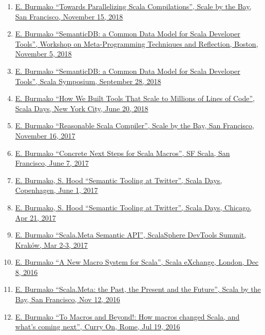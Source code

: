 \documentclass[margin, 10pt]{Stylesheet}
\begin{document}
\begin{resume}
\begin{enumerate} \itemsep -2pt
\item \href{https://github.com/twitter/rsc/raw/master/docs/2018-11-15-ScaleByTheBay.pdf}{E. Burmako ``Towards Parallelizing Scala Compilations'', Scale by the Bay, San Francisco, November 15, 2018}
\item \href{https://2018.splashcon.org/track/meta-2018#About}{E. Burmako ``SemanticDB: a Common Data Model for Scala Developer Tools'', Workshop on Meta-Programming Techniques and Reflection, Boston, November 5, 2018}
\item \href{https://conf.researchr.org/track/scala-2018/scala-2018-papers#About}{E. Burmako ``SemanticDB: a Common Data Model for Scala Developer Tools'', Scala Symposium, September 28, 2018}
\item \href{http://scalameta.org/talks/2018-06-20-HowWeBuiltToolsThatScaleToMillionsOfLoc.pdf}{E. Burmako ``How We Built Tools That Scale to Millions of Lines of Code'', Scala Days, New York City, June 20, 2018}
\item \href{https://github.com/twitter/rsc/raw/master/docs/2017-11-16-ScaleByTheBay.pdf}{E. Burmako ``Reasonable Scala Compiler'', Scale by the Bay, San Francisco, November 16, 2017}
\item \href{http://scalamacros.org/paperstalks/2017-06-07-ConcreteNextSteps.pdf}{E. Burmako ``Concrete Next Steps for Scala Macros'', SF Scala, San Francisco, June 7, 2017}
\item \href{http://scalameta.org/talks/2017-06-01-SemanticToolingAtTwitter.pdf}{E. Burmako, S. Hood ``Semantic Tooling at Twitter'', Scala Days, Copenhagen, June 1, 2017}
\item \href{http://scalameta.org/talks/2017-06-01-SemanticToolingAtTwitter.pdf}{E. Burmako, S. Hood ``Semantic Tooling at Twitter'', Scala Days, Chicago, Apr 21, 2017}
\item \href{http://scalamacros.org/paperstalks/2017-03-02-ScalaSphere.pdf}{E. Burmako ``Scala.Meta Semantic API'', ScalaSphere DevTools Summit, Krak\'{o}w, Mar 2-3, 2017}
\item \href{http://scalamacros.org/paperstalks/2016-12-08-Scalax.pdf}{E. Burmako ``A New Macro System for Scala'', Scala eXchange, London, Dec 8, 2016}
\item \href{http://scalamacros.org/paperstalks/2016-11-12-ScalaByTheBay.pdf}{E. Burmako ``Scala.Meta: the Past, the Present and the Future'', Scala by the Bay, San Francisco, Nov 12, 2016}
\item \href{http://scalamacros.org/paperstalks/2016-07-19-ToMacrosAndBeyond.pdf}{E. Burmako ``To Macros and Beyond!: How macros changed Scala, and what's coming next'', Curry On, Rome, Jul 19, 2016}

\end{enumerate}
\end{resume}
\end{document}

